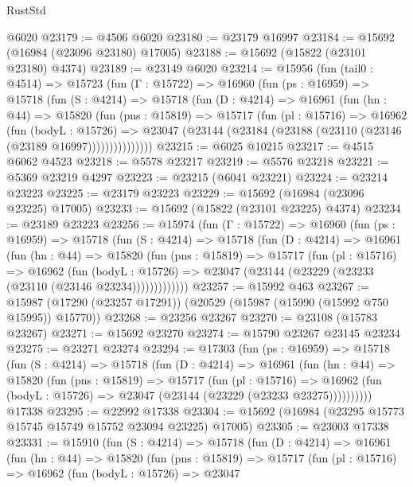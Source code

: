 \begin{lexlean}{RustStd}
\begin{coremodule}
    @6020
@23179 := @4506 @6020
@23180 := @23179 @16997
@23184 := @15692 (@16984 (@23096 @23180) @17005)
@23188 := @15692 (@15822 (@23101 @23180) @4374)
@23189 := @23149 @6020
@23214 := @15956
    (fun (tail0 : @4514) =>
    @15723
      (fun (Γ : @15722) =>
      @16960
        (fun (ps : @16959) =>
        @15718
          (fun (S : @4214) =>
          @15718
            (fun (D : @4214) =>
            @16961
              (fun (hn : @44) =>
              @15820
                (fun (pns : @15819) =>
                @15717
                  (fun (pl : @15716) =>
                  @16962
                    (fun (bodyL : @15726) =>
                    @23047 (@23144 (@23184 (@23188 (@23110 (@23146 (@23189 @16997)))))))))))))))
@23215 := @6025 @10215
@23217 := @4515 @6062 @4523
@23218 := @5578 @23217
@23219 := @5576 @23218
@23221 := @5369 @23219 @4297
@23223 := @23215 (@6041 @23221)
@23224 := @23214 @23223
@23225 := @23179 @23223
@23229 := @15692 (@16984 (@23096 @23225) @17005)
@23233 := @15692 (@15822 (@23101 @23225) @4374)
@23234 := @23189 @23223
@23256 := @15974
    (fun (Γ : @15722) =>
    @16960
      (fun (ps : @16959) =>
      @15718
        (fun (S : @4214) =>
        @15718
          (fun (D : @4214) =>
          @16961
            (fun (hn : @44) =>
            @15820
              (fun (pns : @15819) =>
              @15717
                (fun (pl : @15716) =>
                @16962
                  (fun (bodyL : @15726) =>
                  @23047 (@23144 (@23229 (@23233 (@23110 (@23146 @23234)))))))))))))
@23257 := @15992 @463
@23267 := @15987 (@17290 (@23257 @17291)) (@20529 (@15987 (@15990 (@15992 @750 @15995)) @15770))
@23268 := @23256 @23267
@23270 := @23108 (@15783 @23267)
@23271 := @15692 @23270
@23274 := @15790 @23267 @23145 @23234
@23275 := @23271 @23274
@23294 := @17303
    (fun (ps : @16959) =>
    @15718
      (fun (S : @4214) =>
      @15718
        (fun (D : @4214) =>
        @16961
          (fun (hn : @44) =>
          @15820
            (fun (pns : @15819) =>
            @15717
              (fun (pl : @15716) =>
              @16962 (fun (bodyL : @15726) => @23047 (@23144 (@23229 (@23233 @23275))))))))))
    @17338
@23295 := @22992 @17338
@23304 := @15692 (@16984 (@23295 @15773 @15745 @15749 @15752 @23094 @23225) @17005)
@23305 := @23003 @17338
@23331 := @15910
    (fun (S : @4214) =>
    @15718
      (fun (D : @4214) =>
      @16961
        (fun (hn : @44) =>
        @15820
          (fun (pns : @15819) =>
          @15717
            (fun (pl : @15716) =>
            @16962
              (fun (bodyL : @15726) =>
              @23047

\end{coremodule}
\end{lexlean}
